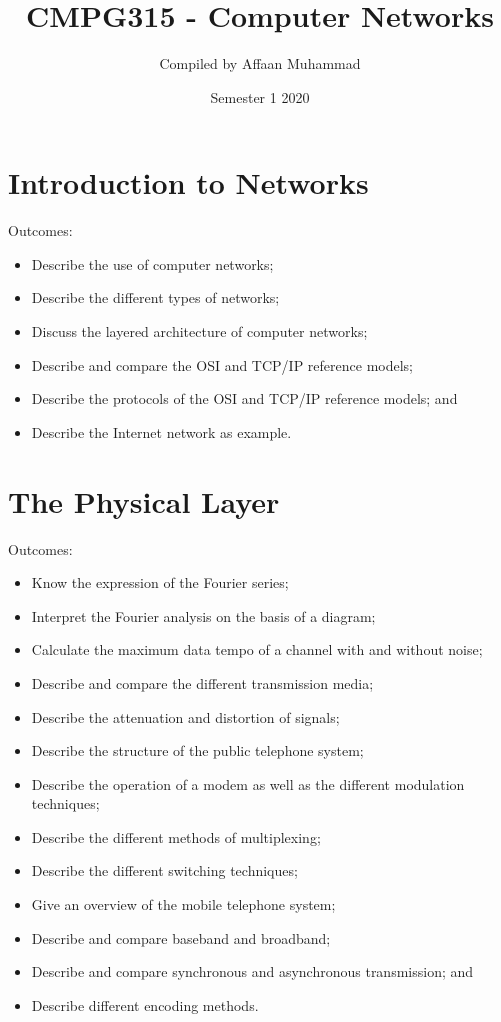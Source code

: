 \documentclass[a4paper, 12pt, titlepage]{report}
\begin{document}
\linespread{1.5}
\title{CMPG315 - Computer Networks}
\author{Compiled by Affaan Muhammad}
\date{Semester 1 2020}
\maketitle
\tableofcontents{}
\chapter{Introduction to Networks}
Outcomes:
\begin{itemize}
\item Describe the use of computer networks;
\item Describe the different types of networks;
\item Discuss the layered architecture of computer networks;
\item Describe and compare the OSI and TCP/IP reference models;
\item Describe the protocols of the OSI and TCP/IP reference models; and
\item Describe the Internet network as example.
\end{itemize}
\chapter{The Physical Layer}
Outcomes:
\begin{itemize}
\item Know the expression of the Fourier series;
\item Interpret the Fourier analysis on the basis of a diagram;
\item Calculate the maximum data tempo of a channel with and without noise;
\item Describe and compare the different transmission media;
\item Describe the attenuation and distortion of signals;
\item Describe the structure of the public telephone system;
\item Describe the operation of a modem as well as the different modulation techniques;
\item Describe the different methods of multiplexing;
\item Describe the different switching techniques;
\item Give an overview of the mobile telephone system;
\item Describe and compare baseband and broadband;
\item Describe and compare synchronous and asynchronous transmission; and
\item Describe different encoding methods.
\end{itemize}
\end{document}
